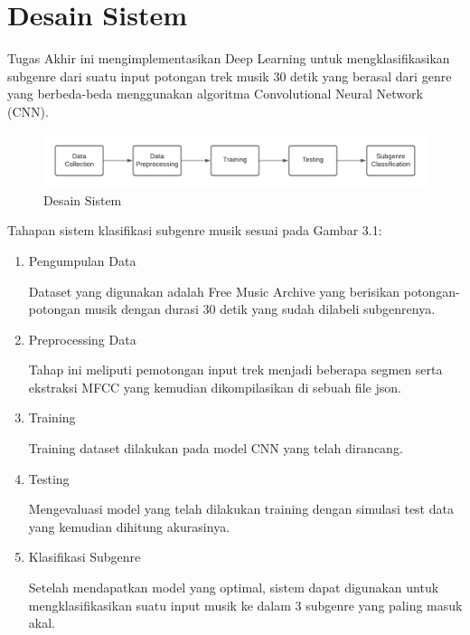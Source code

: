 \section{Desain Sistem}
\label{sec:desainsistem}

Tugas Akhir ini mengimplementasikan Deep Learning untuk mengklasifikasikan subgenre dari suatu input potongan trek musik 30 detik yang berasal dari genre yang berbeda-beda menggunakan algoritma Convolutional Neural Network (CNN).

\begin{figure}[h]
	\centering
	
	\includegraphics[width=\textwidth]{gambar/desain sistem1}
	
	\caption{Desain Sistem}
	\label{fig:desainsistem}
\end{figure}

Tahapan sistem klasifikasi subgenre musik sesuai pada Gambar 3.1:

\begin{enumerate}
	\item Pengumpulan Data
	
	Dataset yang digunakan adalah Free Music Archive yang berisikan potongan-potongan musik dengan durasi 30 detik yang sudah dilabeli subgenrenya.
	\item Preprocessing Data
	
	Tahap ini meliputi pemotongan input trek menjadi beberapa segmen serta ekstraksi MFCC yang kemudian dikompilasikan di sebuah file json.
	\item Training
	
	Training dataset dilakukan pada model CNN yang telah dirancang.
	
	\item Testing
	
	Mengevaluasi model yang telah dilakukan training dengan simulasi test data yang kemudian dihitung akurasinya.
	
	\item Klasifikasi Subgenre
	
	Setelah mendapatkan model yang optimal, sistem dapat digunakan untuk mengklasifikasikan suatu input musik ke dalam 3 subgenre yang paling masuk akal.
	
\end{enumerate}



